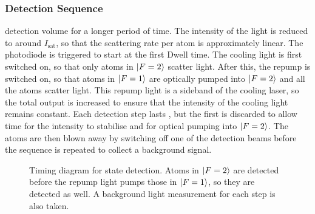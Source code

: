 \subsubsection{Detection Sequence}\label{subsec:detection_sequence}
detection volume for a longer period of time. The intensity of the
light is reduced to around \(I_\text{sat}\), so that the
scattering rate per atom is approximately linear. The photodiode is
triggered to start at the first Dwell time. The cooling light is first
switched on, so that only atoms in \(\ket{F=2}\) scatter light. After this, the repump
is switched on, so that atoms in \(\ket{F=1}\) are optically pumped
into \(\ket{F=2}\) and all the atoms scatter light. This repump light is a
sideband of the cooling laser, so the total output is increased
to ensure that the intensity of the cooling light remains constant.
Each detection step lasts , but the
first  is discarded to allow time for the
intensity to stabilise and for optical pumping into \(\ket{F=2}\).
The atoms are then blown away by switching off one of the detection
beams before the sequence is repeated to collect a
background signal.
\begin{figure}[!htbp] 
  \centering
  \resizebox{0.7\textwidth}{!}{} 
  \caption[State detection sequence timing]{Timing diagram for state
  detection. Atoms in \(\ket{F=2}\) are detected before the repump
light pumps those in \(\ket{F=1}\), so they are detected as well. A
background light measurement for each step is also taken.}
	\label{fig:detection} 
\end{figure} 
